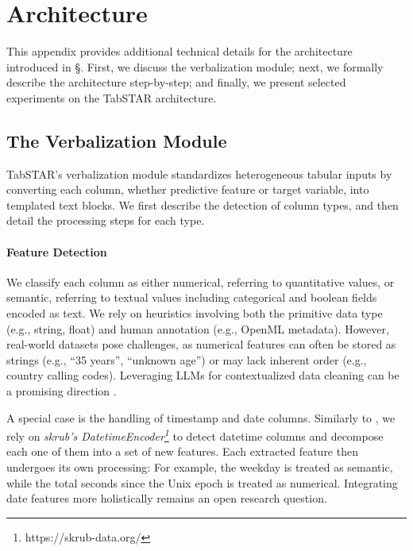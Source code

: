 
\appendix

\section{Architecture}
\label{app:arch}

This appendix provides additional technical details for the architecture introduced in \S{}. First, we discuss the verbalization module; next, we formally describe the architecture step-by-step; and finally, we present selected experiments on the TabSTAR architecture.

\subsection{The Verbalization Module}
\label{app:arch:verbalization}

TabSTAR's verbalization module standardizes heterogeneous tabular inputs by converting each column, whether predictive feature or target variable, into templated text blocks. We first describe the detection of column types, and then detail the processing steps for each type.

\paragraph{Feature Detection}  
We classify each column as either numerical, referring to quantitative values, or semantic, referring to textual values including categorical and boolean fields encoded as text. We rely on heuristics involving both the primitive data type (e.g., string, float) and human annotation (e.g., OpenML metadata). However, real-world datasets pose challenges, as numerical features can often be stored as strings (e.g., ``35 years'', ``unknown age'') or may lack inherent order (e.g., country calling codes). Leveraging LLMs for contextualized data cleaning can be a promising direction \cite{bendinelli_exploring_2025}.

A special case is the handling of timestamp and date columns. Similarly to \cite{hoo_tabular_2024}, we rely on \textit{skrub's DatetimeEncoder\footnote{https://skrub-data.org/}} to detect datetime columns and decompose each one of them into a set of new features. Each extracted feature then undergoes its own processing: For example, the weekday is treated as semantic, while the total seconds since the Unix epoch is treated as numerical. Integrating date features more holistically remains an open research question.


